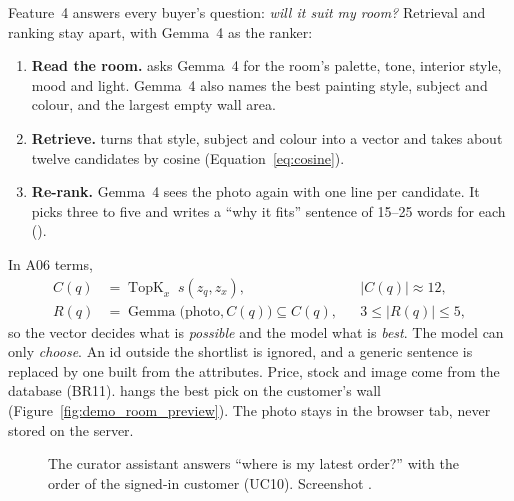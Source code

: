 Feature~4 answers every buyer's question: \emph{will it suit my room?} Retrieval and ranking stay apart, with
Gemma~4 as the ranker:
\begin{enumerate}
\item \textbf{Read the room.}  asks Gemma~4 for the room's palette, tone, interior
      style, mood and light. Gemma~4 also names the best painting style, subject and colour, and the largest empty
      wall area.
\item \textbf{Retrieve.}  turns that style, subject and colour into a vector and takes
      about twelve candidates by cosine (Equation~\ref{eq:cosine}).
\item \textbf{Re-rank.} Gemma~4 sees the photo again with one line per candidate. It picks three to five and writes
      a ``why it fits'' sentence of 15--25 words for each ().
\end{enumerate}
In A06 terms,
\begin{align}
C(q) &= \operatorname{TopK}_{x}\; s(z_q, z_x), && |C(q)| \approx 12,\\
R(q) &= \operatorname{Gemma}\bigl(\text{photo}, C(q)\bigr) \subseteq C(q), && 3 \le |R(q)| \le 5,
\end{align}
so the vector decides what is \emph{possible} and the model what is \emph{best}. The model can only \emph{choose}.
An id outside the shortlist is ignored, and a generic sentence is replaced by one built from the attributes. Price,
stock and image come from the database (BR11).  hangs the best pick on the customer's wall
(Figure~\ref{fig:demo_room_preview}). The photo stays in the browser tab, never stored on the server.

\begin{figure}[htbp]
\centering
\begin{minipage}[t]{0.485\linewidth}\centering
{}
\caption[Find a painting for my room]{Find a painting for my room: the reading of the room (palette, style, mood), the suggestions chosen by Gemma~4 with their reasons, and a painting placed on the wall (UC14). Screenshot .}\label{fig:demo_room_preview}
\end{minipage}\hfill
\begin{minipage}[t]{0.485\linewidth}\centering
{}
\caption[The curator assistant]{The curator assistant answers ``where is my latest order?'' with the order of the signed-in customer (UC10). Screenshot .}\label{fig:demo_assistant}
\end{minipage}
\end{figure}

